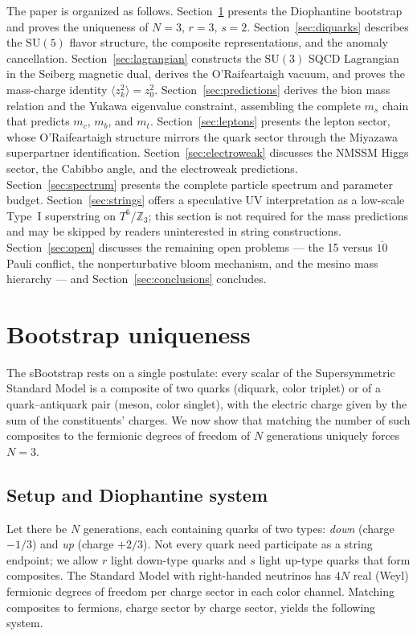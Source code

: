 \documentclass[12pt,a4paper]{article}
\begin{document}
The paper is organized as follows. Section~\ref{sec:bootstrap} presents
the Diophantine bootstrap and proves the uniqueness of $N=3$, $r=3$,
$s=2$. Section~\ref{sec:diquarks} describes the $\mathrm{SU}(5)$ flavor
structure, the composite representations, and the anomaly cancellation.
Section~\ref{sec:lagrangian} constructs the $\mathrm{SU}(3)$ SQCD
Lagrangian in the Seiberg magnetic dual, derives the O'Raifeartaigh
vacuum, and proves the mass-charge identity $\langle z_k^2\rangle = z_0^2$.
Section~\ref{sec:predictions} derives the bion mass relation and the
Yukawa eigenvalue constraint, assembling the complete $m_s$ chain that
predicts $m_c$, $m_b$, and $m_t$. Section~\ref{sec:leptons} presents the
lepton sector, whose O'Raifeartaigh structure mirrors the quark sector
through the Miyazawa superpartner identification. Section~\ref{sec:electroweak} discusses the NMSSM Higgs
sector, the Cabibbo angle, and the electroweak predictions.
Section~\ref{sec:spectrum} presents the complete particle spectrum and
parameter budget.
Section~\ref{sec:strings} offers a speculative UV interpretation
as a low-scale Type~I superstring on $T^6/\mathbb{Z}_3$; this section
is not required for the mass predictions and may be skipped by readers
uninterested in string constructions.
Section~\ref{sec:open} discusses the remaining open problems ---
the 15 versus $\overline{10}$ Pauli conflict, the
nonperturbative bloom mechanism, and the mesino mass hierarchy ---
and Section~\ref{sec:conclusions} concludes.


\section{Bootstrap uniqueness}
\label{sec:bootstrap}

The sBootstrap rests on a single postulate: every scalar of the
Supersymmetric Standard Model is a composite of two quarks (diquark,
color triplet) or of a quark--antiquark pair (meson, color singlet),
with the electric charge given by the sum of the constituents' charges.
We now show that matching the number of such composites to the
fermionic degrees of freedom of $N$ generations uniquely forces
$N = 3$.

\subsection{Setup and Diophantine system}
Let there be $N$ generations, each containing quarks of two types:
\emph{down} (charge $-1/3$) and \emph{up} (charge $+2/3$).  Not
every quark need participate as a string endpoint; we allow
$r$ light down-type quarks and $s$ light up-type quarks that form
composites.  The Standard Model with right-handed neutrinos has
$4N$ real (Weyl) fermionic degrees of freedom per charge sector in
each color channel.  Matching composites to fermions, charge sector
by charge sector, yields the following system.
\end{document}
